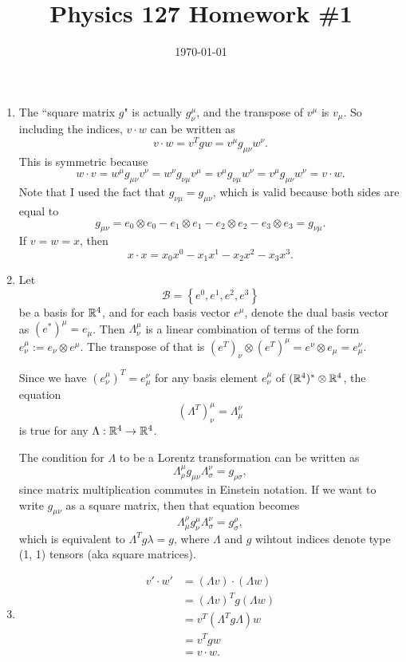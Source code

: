 \documentclass{article}
\date{\today}
\title{Physics 127 Homework \#1}
\begin{document}
\maketitle

\begin{prob}
\end{prob}
\begin{enumerate}[label=(\alph*)]
    \item The ``square matrix $g$" is actually $g_\nu^\mu$, and the transpose of $v^\mu$ is $v_\mu$. So including the indices, $v \cdot w$ can be written as
        \[ v \cdot w = v^T g w = v^\mu g_{\mu \nu} w^\nu. \]
        This is symmetric because
        \[ w \cdot v = w^\mu g_{\mu \nu} v^\nu = w^\nu g_{\nu \mu} v^\mu = v^\mu g_{\nu \mu} w^\nu = v^\mu g_{\mu \nu} w^\nu = v \cdot w. \]
        Note that I used the fact that $g_{\nu \mu} = g_{\mu \nu}$, which is valid because both sides are equal to
        \[ g_{\mu \nu} = e_0 \otimes e_0 - e_1 \otimes e_1 - e_2 \otimes e_2 - e_3 \otimes e_3 = g_{\nu \mu}. \]
        If $v=w=x$, then
        \[ x \cdot x = x_0x^0 - x_1x^1 - x_2x^2 - x_3x^3. \]
    \item Let
        \[ \mathcal{B} = \left\{ e^0, e^1, e^2, e^3 \right\} \]
        be a basis for $\mathbb{R}^4$, and for each basis vector $e^\mu$, denote the dual basis vector as $(e^*)^\mu = e_\mu$. Then $\Lambda_\nu^\mu$ is a linear combination of terms of the form $e_\nu^\mu := e_\nu \otimes e^\mu$. The transpose of that is $(e^T)_\nu \otimes (e^T)^\mu = e^\nu \otimes e_\mu = e_\mu^\nu$.
        \par
        Since we have $(e_\nu^\mu)^T = e_\mu^\nu$ for any basis element $e_\nu^\mu$ of $(\mathbb{R}^4)^* \otimes \mathbb{R}^4$, the equation
        \[ (\Lambda^T)_\nu^\mu = \Lambda_\mu^\nu \]
        is true for any $\Lambda: \mathbb{R}^4 \rightarrow \mathbb{R}^4$.
        \par
        The condition for $\Lambda$ to be a Lorentz transformation can be written as
        \[ \Lambda_\rho^\mu g_{\mu \nu} \Lambda_\sigma^\nu = g_{\rho \sigma}, \]
        since matrix multiplication commutes in Einstein notation. If we want to write $g_{\mu \nu}$ as a square matrix, then that equation becomes
        \[ \Lambda_\mu^\rho g_\nu^\mu \Lambda_\sigma^\nu = g_\sigma^\rho, \]
        which is equivalent to $\Lambda^T g \lambda = g$, where $\Lambda$ and $g$ wihtout indices denote type (1, 1) tensors (aka square matrices).
    \item \begin{align*}
            v' \cdot w' &= (\Lambda v) \cdot (\Lambda w) \\
                        &= (\Lambda v)^T g (\Lambda w) \\
                        &= v^T (\Lambda^T g \Lambda) w \\
                        &= v^T g w \\
                        &= v \cdot w.
    \end{align*}
\end{enumerate}
\end{document}
